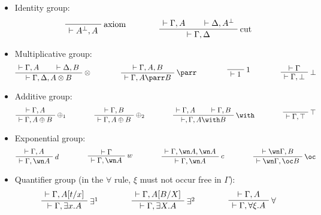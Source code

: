\begin{itemize}
\item
  Identity group:
\begin{equation*}
  \LabelRule{\rulename{axiom}}
  \NulRule{ \vdash A\orth, A}
  \DisplayProof
  \qquad\qquad
  \AxRule{ \vdash \Gamma, A }
  \AxRule{ \vdash \Delta, A\orth }
  \LabelRule{\rulename{cut}}
  \BinRule{ \vdash \Gamma, \Delta }
  \DisplayProof
\end{equation*}
\item
  Multiplicative group:
\begin{equation*}
\AxRule{ \vdash \Gamma, A
} \AxRule{ \vdash \Delta,
B } \LabelRule{ \tens }
\BinRule{ \vdash \Gamma,
\Delta, A \tens B }
\DisplayProof
\qquad\qquad
\AxRule{ \vdash \Gamma, A, B }
\LabelRule{ \parr }
\UnaRule{ \vdash \Gamma, A \parr B }
\DisplayProof
\qquad\qquad
\LabelRule{ \one }
\NulRule{ \vdash \one }
\DisplayProof
\qquad\qquad
\AxRule{ \vdash \Gamma }
\LabelRule{ \bot }
\UnaRule{ \vdash \Gamma, \bot }
\DisplayProof
\end{equation*}
\item
  Additive group:
\begin{equation*}
\AxRule{ \vdash \Gamma, A} \LabelRule{ \plus_1 }
\UnaRule{ \vdash \Gamma, A \plus B }
\DisplayProof
\qquad\qquad
\AxRule{ \vdash \Gamma, B }
\LabelRule{ \plus_2 }
\UnaRule{ \vdash \Gamma, A \plus B }
\DisplayProof
\qquad\qquad
\AxRule{ \vdash \Gamma, A }
\AxRule{ \vdash \Gamma, B }
\LabelRule{ \with }
\BinRule{ \vdash, \Gamma, A \with B }
\DisplayProof
\qquad\qquad
\LabelRule{ \top }
\NulRule{ \vdash \Gamma, \top }
\DisplayProof
\end{equation*}
\item
  Exponential group:
\begin{equation*}
\AxRule{ \vdash \Gamma, A } \LabelRule{ d }
\UnaRule{ \vdash \Gamma, \wn A }
\DisplayProof
\qquad\qquad
\AxRule{ \vdash \Gamma }
\LabelRule{ w }
\UnaRule{ \vdash \Gamma, \wn A }
\DisplayProof
\qquad\qquad
\AxRule{ \vdash \Gamma, \wn A, \wn A }
\LabelRule{ c }
\UnaRule{ \vdash \Gamma, \wn A }
\DisplayProof
\qquad\qquad
\AxRule{ \vdash \wn\Gamma, B }
\LabelRule{ \oc }
\UnaRule{ \vdash \wn\Gamma, \oc B }
\DisplayProof
\end{equation*}
\item
  Quantifier group (in the \(\forall\) rule, \(\xi\) must not occur free in \(\Gamma\)):
\begin{equation*}
\AxRule{ \vdash \Gamma,
A[t/x] } \LabelRule{ \exists^1 }
\UnaRule{ \vdash \Gamma, \exists x.A }
\DisplayProof
\qquad\qquad
\AxRule{ \vdash \Gamma, A[B/X] }
\LabelRule{ \exists^2 }
\UnaRule{ \vdash \Gamma, \exists X.A }
\DisplayProof
\qquad\qquad
\AxRule{ \vdash \Gamma, A }
\LabelRule{ \forall }
\UnaRule{ \vdash \Gamma, \forall \xi.A }
\DisplayProof
\end{equation*}
\end{itemize}


